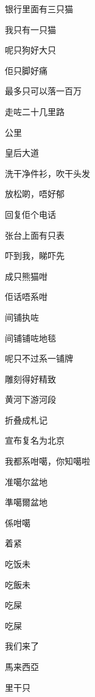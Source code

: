 \documentclass{article}
\begin{document}
\begin{jyutpingscope}[script=simplified]
银行里面有三只猫

我只有一只猫

呢只狗好大只

佢只脚好痛

最多只可以落一百万

走咗二十几里路

公里

皇后大道

洗干净件衫，吹干头发

放松啲，唔好郁

回复佢个电话

张台上面有只表

吓到我，睇吓先

成只熊猫咁

佢话唔系咁

间铺执咗

间铺铺咗地毯

呢只不过系一铺牌

雕刻得好精致

黄河下游河段

折叠成札记

宣布复名为北京

我都系咁噶，你知噶啦

准噶尔盆地
\end{jyutpingscope}

\begin{jyutpingscope}[script=traditional]
準噶爾盆地

係咁噶
\end{jyutpingscope}

\begin{jyutpingscope}[script=simplified]
着紧

吃饭未
\end{jyutpingscope}

\begin{jyutpingscope}[script=traditional]
吃飯未
\end{jyutpingscope}

\begin{jyutpingscope}[script=simplified]
吃屎
\end{jyutpingscope}

\begin{jyutpingscope}[script=traditional]
吃屎

我们来了

馬来西亞

里干只
\end{jyutpingscope}
\end{document}
